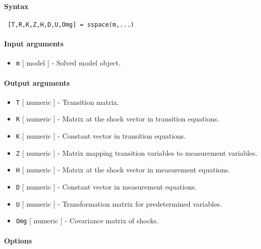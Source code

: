 


	\paragraph{Syntax}
 
 \begin{verbatim}
 [T,R,K,Z,H,D,U,Omg] = sspace(m,...)
 \end{verbatim}
 
 \paragraph{Input arguments}
 
 \begin{itemize}
 \item
   \texttt{m} {[} model {]} - Solved model object.
 \end{itemize}
 
 \paragraph{Output arguments}
 
 \begin{itemize}
 \item
   \texttt{T} {[} numeric {]} - Transition matrix.
 \item
   \texttt{R} {[} numeric {]} - Matrix at the shock vector in transition
   equations.
 \item
   \texttt{K} {[} numeric {]} - Constant vector in transition equations.
 \item
   \texttt{Z} {[} numeric {]} - Matrix mapping transition variables to
   measurement variables.
 \item
   \texttt{H} {[} numeric {]} - Matrix at the shock vector in measurement
   equations.
 \item
   \texttt{D} {[} numeric {]} - Constant vector in measurement equations.
 \item
   \texttt{U} {[} numeric {]} - Transformation matrix for predetermined
   variables.
 \item
   \texttt{Omg} {[} numeric {]} - Covariance matrix of shocks.
 \end{itemize}
 
 \paragraph{Options}
 
